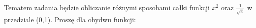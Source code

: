 Tematem zadania będzie obliczanie różnymi sposobami całki funkcji $ x^2 $ oraz $ \frac{1}{\sqrt{x}} $ w przedziale (0,1). Proszę dla obydwu funkcji:
